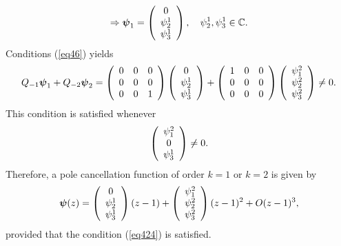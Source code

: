 \documentclass[11pt, reqno]{amsart}
\theoremstyle{plain}
\theoremstyle{remark}
\numberwithin{equation}{section}
\begin{document}
\[
\Rightarrow\boldsymbol{\psi}_{1}=\left( {\begin{array}{*{20}c}
0 \\
\psi_{2}^{1} \\
\psi_{3}^{1}\\
\end{array} } \right), \quad \psi_{2}^{1}, \psi_{3}^{1} \in \mathbb{C}.
\]
Conditions (\ref{eq46}) yields
\[
Q_{-1}\boldsymbol{\psi}_{1}+ Q_{-2}\boldsymbol{\psi}_{2}= \left( {\begin{array}{*{20}c}
0 & 0 & 0\\
0 &  0 & 0\\
0 &  0 & 1\\
\end{array} } \right)\left( {\begin{array}{*{20}c}
0 \\
\psi_{2}^{1} \\
\psi_{3}^{1}\\
\end{array} } \right)+\left( {\begin{array}{*{20}c}
1 & 0 & 0\\
0 &  0 & 0\\
0 &  0 & 0\\
\end{array} } \right)\left( {\begin{array}{*{20}c}
\psi_{1}^{2} \\
\psi_{2}^{2} \\
\psi_{3}^{2}\\
\end{array} } \right) \neq 0.
\]
This condition is satisfied whenever 
\begin{equation}\label{eq424}
\left( {\begin{array}{*{20}c}
\psi_{1}^{2} \\
0 \\
\psi_{3}^{1}\\
\end{array} } \right) \neq 0.
\end{equation}
Therefore, a pole cancellation function of order $k=1$ or $k=2$ is given by
\[
\boldsymbol{\psi}(z)=\left( {\begin{array}{*{20}c}
0 \\
\psi_{2}^{1} \\
\psi_{3}^{1}\\
\end{array} } \right)(z-1)+\left( {\begin{array}{*{20}c}
\psi_{1}^{2} \\
\psi_{2}^{2} \\
\psi_{3}^{2}\\
\end{array} } \right) (z-1)^{2}+O(z-1)^{3},
\]
provided that the condition (\ref{eq424}) is satisfied. 
\end{document}
